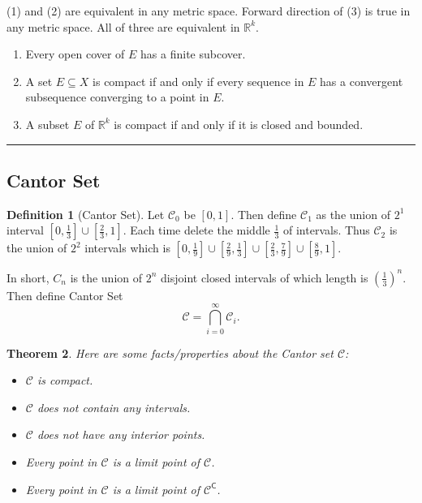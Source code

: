 \documentclass[12pt, lettersize]{book}
\theoremstyle{plain}
\newtheorem{thm}{Theorem}[section]
\theoremstyle{definition}
\newtheorem{dfn}[thm]{Definition}
\theoremstyle{remark}
\newcommand{\R}{\mathbb{R}}
\newcommand{\com}{\mathsf{C}}
\newcommand{\lline}{\noindent\rule{\textwidth}{1pt}}
\begin{document}
		\begin{tcolorbox}[title=\textbf{Characterization of compact sets}]
			(1) and (2) are equivalent in any metric space. Forward direction of (3) is true in any metric space. All of three are equivalent in $\R^k$.
			\begin{enumerate}
				\item Every open cover of $E$ has a finite subcover.
				\item A set $E\subseteq X$ is compact if and only if every sequence in $E$ has a convergent subsequence converging to a point in $E$.
				\item A subset $E$ of $\mathbb{R}^k$ is compact if and only if it is closed and bounded.
			\end{enumerate}
		\end{tcolorbox}
		\lline
		
		\subsection*{Cantor Set}
		\begin{dfn}[Cantor Set]
			Let $\mathcal{C}_0$ be $[0,1]$. Then define $\mathcal{C}_1$ as the union of $2^1$ interval $[0,\frac{1}{3}]\cup[\frac{2}{3},1]$. Each time delete the middle $\frac{1}{3}$ of intervals. Thus $\mathcal{C}_2$ is the union of $2^2$ intervals which is $[0,\frac{1}{9}]\cup[\frac{2}{9},\frac{1}{3}]\cup[\frac{2}{3},\frac{7}{9}]\cup[\frac{8}{9},1]$.\smallskip
			
			In short, $C_n$ is the union of $2^n$ disjoint closed intervals of which length is $(\frac{1}{3})^n$. Then define Cantor Set
			\begin{displaymath}
				\mathcal{C}=\bigcap_{i=0}^{\infty}\mathcal{C}_i.
			\end{displaymath}
		\end{dfn}
		\begin{thm}
			Here are some facts/properties about the Cantor set $\mathcal{C}$:
			\begin{itemize}
				\item $\mathcal{C}$ is compact.
				\item $\mathcal{C}$ does not contain any intervals.
				\item $\mathcal{C}$ does not have any interior points.
				\item Every point in $\mathcal{C}$ is a limit point of $\mathcal{C}$.
				\item Every point in $\mathcal{C}$ is a limit point of $\mathcal{C}^\com$.
			\end{itemize}
		\end{thm}	
		\newpage	
			
\end{document}
